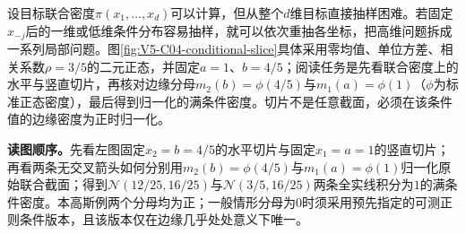 \documentclass[UTF8,a4paper,11pt,openany]{ctexbook}
\begin{document}
\setcounter{page}{664}
\setcounter{chapter}{33}
\setcounter{figure}{1}
\pagestyle{headings}
设目标联合密度$\pi(x_1,\ldots,x_d)$可以计算，但从整个$d$维目标直接抽样困难。若固定$x_{-j}$后的一维或低维条件分布容易抽样，就可以依次重抽各坐标，把高维问题拆成一系列局部问题。图\ref{fig:V5-C04-conditional-slice}具体采用零均值、单位方差、相关系数$\rho=3/5$的二元正态，并固定$a=1$、$b=4/5$；阅读任务是先看联合密度上的水平与竖直切片，再核对边缘分母$m_2(b)=\phi(4/5)$与$m_1(a)=\phi(1)$（$\phi$为标准正态密度），最后得到归一化的满条件密度。切片不是任意截面，必须在该条件值的边缘密度为正时归一化。


\noindent\textbf{读图顺序。}先看左图固定$x_2=b=4/5$的水平切片与固定$x_1=a=1$的竖直切片；再看两条无交叉箭头如何分别用$m_2(b)=\phi(4/5)$与$m_1(a)=\phi(1)$归一化原始联合截面；得到$\mathcal N(12/25,16/25)$与$\mathcal N(3/5,16/25)$两条全实线积分为$1$的满条件密度。本高斯例两个分母均为正；一般情形分母为$0$时须采用预先指定的可测正则条件版本，且该版本仅在边缘几乎处处意义下唯一。\par
\FloatBarrier
\end{document}
